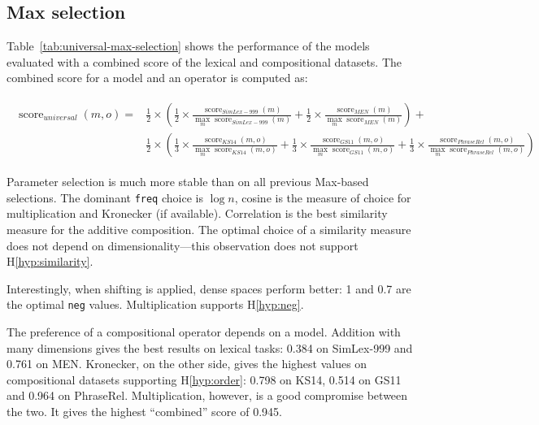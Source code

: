 \subsection{Max selection}
\label{sec:max-selection-universal}

Table~\ref{tab:universal-max-selection} shows the performance of the models evaluated with a combined score of the lexical and compositional datasets. The combined score for a model and an operator is computed as:

{\scriptsize
  \begin{align}
    \begin{split}
\operatorname{score}_\mathit{universal}(\mathit{m}, \mathit{o}) = & %
\frac{1}{2}\times\left(
\frac{1}{2}\times%
\frac{\operatorname{score}_\mathit{SimLex-999}(\mathit{m})}%
{\max_m\operatorname{score}_\mathit{SimLex-999}(m)}%
+%
\frac{1}{2}\times%
\frac{\operatorname{score}_\mathit{MEN}(\mathit{m})}%
{\max_m\operatorname{score}_\mathit{MEN}(m)}%
\right) +
\\
&\frac{1}{2}\times\left(
\frac{1}{3}\times%
\frac{\operatorname{score}_\mathit{KS14}(\mathit{m}, \mathit{o})}%
{\max_m\operatorname{score}_\mathit{KS14}(m, \mathit{o})}%
+%
\frac{1}{3}\times%
\frac{\operatorname{score}_\mathit{GS11}(\mathit{m}, \mathit{o})}%
{\max_m\operatorname{score}_\mathit{GS11}(m, \mathit{o})}%
+%
\frac{1}{3}\times%
\frac{\operatorname{score}_\mathit{PhraseRel}(\mathit{m, \mathit{o}})}%
{\max_m\operatorname{score}_\mathit{PhraseRel}(m, \mathit{o})}%
\right)
\end{split}
\end{align}
}

Parameter selection is much more stable than on all previous Max-based selections. The dominant \texttt{freq} choice is $\log n$, cosine is the measure of choice for multiplication and Kronecker (if available). Correlation is the best similarity measure for the additive composition. The optimal choice of a similarity measure does not depend on dimensionality---this observation does not support H\ref{hyp:similarity}.

Interestingly, when shifting is applied, dense spaces perform better: 1 and 0.7 are the optimal \texttt{neg} values. Multiplication  supports H\ref{hyp:neg}.

The preference of a compositional operator depends on a model. Addition with many dimensions gives the best results on lexical tasks: 0.384 on SimLex-999 and 0.761 on MEN. Kronecker, on the other side, gives the highest values on compositional datasets supporting H\ref{hyp:order}: 0.798 on KS14, 0.514 on GS11 and 0.964 on PhraseRel. Multiplication, however, is a good compromise between the two. It gives the highest ``combined'' score of 0.945.

